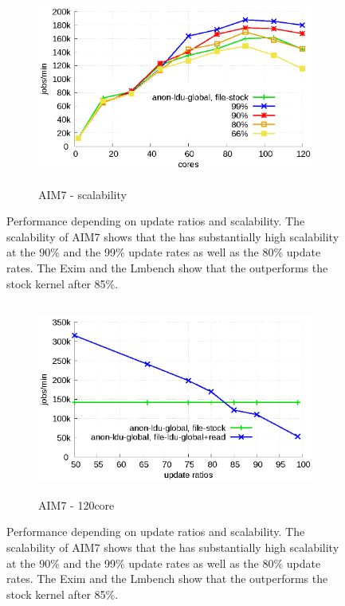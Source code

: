 \begin{figure}[t!]
    \centering
    \begin{subfigure}[b]{1\textwidth}
        \includegraphics[height=2.5in]{graph/ratio_exim_core.eps}
        \caption{AIM7 - scalability}
    \end{subfigure}%
    \caption{Performance depending on update ratios and scalability.
    The scalability of AIM7 shows that the \LDU has substantially high
    scalability at the 90\% and the 99\% update rates as well as
    the 80\% update rates. The Exim and the Lmbench show that the \LDU outperforms the stock kernel after 85\%.}
    \label{fig:UpdateRate_exim_2}
\end{figure}

\begin{figure}[t!]
    \centering
    \begin{subfigure}[b]{1\textwidth}
  \begin{center}
        \includegraphics[height=2.5in]{graph/ratio_lmbench.eps}
        \caption{AIM7 - 120core}
  \end{center}
    \end{subfigure}%
    \caption{Performance depending on update ratios and scalability.
    The scalability of AIM7 shows that the \LDU has substantially high
    scalability at the 90\% and the 99\% update rates as well as
    the 80\% update rates. The Exim and the Lmbench show that the \LDU outperforms the stock kernel after 85\%.}
    \label{fig:UpdateRate_lmbench}
\end{figure}

